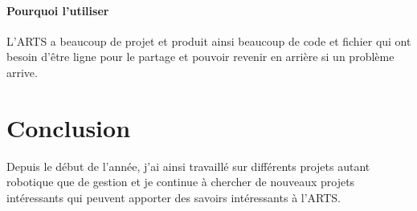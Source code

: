 \documentclass[11pt,a4paper]{report}
\begin{document}
      \subsubsection{Pourquoi l'utiliser}
        L'ARTS a beaucoup de projet et produit ainsi beaucoup de code et fichier qui ont besoin d'être ligne pour le partage et pouvoir revenir en arrière si un problème arrive.

\chapter*{Conclusion}
  Depuis le début de l'année, j'ai ainsi travaillé sur différents projets autant robotique que de gestion et je continue à chercher de nouveaux projets intéressants qui peuvent apporter des savoirs intéressants à l'ARTS.
\end{document}

